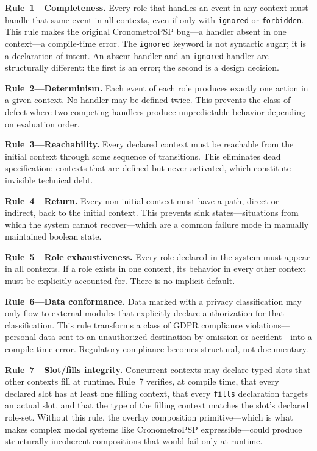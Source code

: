 \textbf{Rule~1---Completeness.} Every role that handles an event in any
context must handle that same event in all contexts, even if only with
\texttt{ignored} or \texttt{forbidden}. This rule makes the original
CronometroPSP bug---a handler absent in one context---a compile-time error.
The \texttt{ignored} keyword is not syntactic sugar; it is a declaration of
intent. An absent handler and an \texttt{ignored} handler are structurally
different: the first is an error; the second is a design decision.

\textbf{Rule~2---Determinism.} Each event of each role produces exactly one
action in a given context. No handler may be defined twice. This prevents the
class of defect where two competing handlers produce unpredictable behavior
depending on evaluation order.

\textbf{Rule~3---Reachability.} Every declared context must be reachable from
the initial context through some sequence of transitions. This eliminates dead
specification: contexts that are defined but never activated, which constitute
invisible technical debt.

\textbf{Rule~4---Return.} Every non-initial context must have a path, direct
or indirect, back to the initial context. This prevents sink states---situations
from which the system cannot recover---which are a common failure mode in
manually maintained boolean state.

\textbf{Rule~5---Role exhaustiveness.} Every role declared in the system must
appear in all contexts. If a role exists in one context, its behavior in every
other context must be explicitly accounted for. There is no implicit default.

\textbf{Rule~6---Data conformance.} Data marked with a privacy classification
may only flow to external modules that explicitly declare authorization for
that classification. This rule transforms a class of GDPR compliance
violations---personal data sent to an unauthorized destination by omission or
accident---into a compile-time error. Regulatory compliance becomes structural,
not documentary.

\textbf{Rule~7---Slot/fills integrity.} Concurrent contexts may declare typed
slots that other contexts fill at runtime. Rule~7 verifies, at compile time,
that every declared slot has at least one filling context, that every
\texttt{fills} declaration targets an actual slot, and that the type of the
filling context matches the slot's declared role-set. Without this rule, the
overlay composition primitive---which is what makes complex modal systems like
CronometroPSP expressible---could produce structurally incoherent compositions
that would fail only at runtime.


